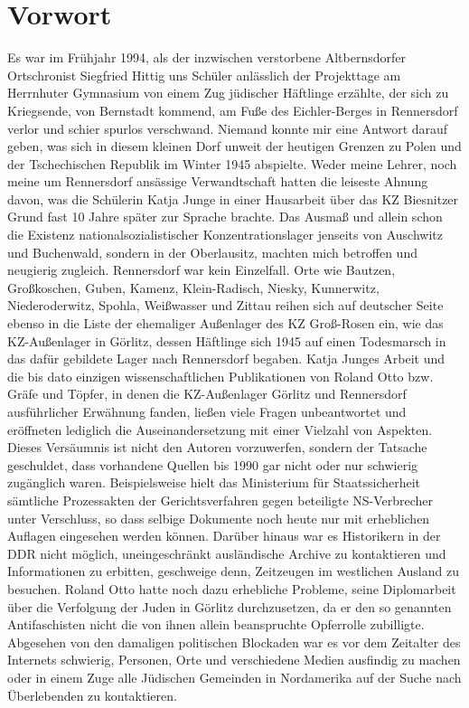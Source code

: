 
\section*{Vorwort}
%
Es war im Frühjahr 1994, als der inzwischen verstorbene Altbernsdorfer Ortschronist Siegfried Hittig uns Schüler anlässlich der Projekttage am Herrnhuter Gymnasium von einem Zug jüdischer Häftlinge erzählte, der sich zu Kriegsende, von Bernstadt kommend, am Fuße des Eichler-Berges in Rennersdorf verlor und schier spurlos verschwand. 
Niemand konnte mir eine Antwort darauf geben, was sich in diesem kleinen Dorf unweit der heutigen Grenzen zu Polen und der Tschechischen Republik im Winter 1945 abspielte. Weder meine Lehrer, noch meine um Rennersdorf ansässige Verwandtschaft hatten die leiseste Ahnung davon, was die Schülerin Katja Junge in einer Hausarbeit über das KZ Biesnitzer Grund fast 10 Jahre später zur Sprache brachte. Das Ausmaß und allein schon die Existenz nationalsozialistischer Konzentrationslager jenseits von Auschwitz und Buchenwald, sondern in der Oberlausitz, machten mich betroffen und neugierig zugleich. Rennersdorf war kein Einzelfall. Orte wie Bautzen, Großkoschen, Guben, Kamenz, Klein-Radisch, Niesky, Kunnerwitz, Niederoderwitz, Spohla, Weißwasser und Zittau reihen sich auf deutscher Seite ebenso in die Liste der ehemaliger Außenlager des KZ Groß-Rosen ein, wie das KZ-Außenlager in Görlitz, dessen Häftlinge sich 1945 auf einen Todesmarsch in das dafür gebildete Lager nach Rennersdorf begaben. Katja Junges Arbeit und die bis dato einzigen wissenschaftlichen Publikationen von Roland Otto bzw. Gräfe und Töpfer, in denen die KZ-Außenlager Görlitz und Rennersdorf ausführlicher Erwähnung fanden, ließen viele Fragen unbeantwortet und eröffneten lediglich die Auseinandersetzung mit einer Vielzahl von Aspekten. Dieses Versäumnis ist nicht den Autoren vorzuwerfen, sondern der Tatsache geschuldet, dass vorhandene Quellen bis 1990 gar nicht oder nur schwierig zugänglich waren. Beispielsweise hielt das Ministerium für Staatssicherheit sämtliche Prozessakten der Gerichtsverfahren gegen beteiligte NS-Verbrecher unter Verschluss, so dass selbige Dokumente noch heute nur mit erheblichen Auflagen eingesehen werden können. Darüber hinaus war es Historikern in der DDR nicht möglich, uneingeschränkt ausländische Archive zu kontaktieren und Informationen zu erbitten, geschweige denn, Zeitzeugen im westlichen Ausland zu besuchen. Roland Otto hatte noch dazu erhebliche Probleme, seine Diplomarbeit über die Verfolgung der Juden in Görlitz durchzusetzen, da er den so genannten Antifaschisten nicht die von ihnen allein beanspruchte Opferrolle zubilligte. Abgesehen von den damaligen politischen Blockaden war es vor dem Zeitalter des Internets schwierig, Personen, Orte und verschiedene Medien ausfindig zu machen oder in einem Zuge alle Jüdischen Gemeinden in Nordamerika auf der Suche nach Überlebenden zu kontaktieren. 

